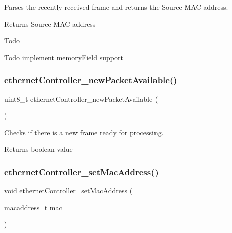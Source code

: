 Parses the recently received frame and returns the Source M\+AC address. 

\begin{DoxyReturn}{Returns}
Source M\+AC address 
\end{DoxyReturn}
\begin{DoxyRefDesc}{Todo}
\item[\mbox{\hyperlink{todo__todo000011}{Todo}}]implement \mbox{\hyperlink{structmemory_field}{memory\+Field}} support \end{DoxyRefDesc}
\mbox{\label{group__data__reception_gae030bd0d97a72b4c38d3ac55132dd7f3}} 
\subsubsection{\texorpdfstring{ethernetController\_newPacketAvailable()}{ethernetController\_newPacketAvailable()}}
{\footnotesize\ttfamily uint8\+\_\+t ethernet\+Controller\+\_\+new\+Packet\+Available (\begin{DoxyParamCaption}{ }\end{DoxyParamCaption})}



Checks if there is a new frame ready for processing. 

\begin{DoxyReturn}{Returns}
boolean value 
\end{DoxyReturn}
\mbox{\label{group__data__reception_ga4856965b47df99d3532a7d1cbb494e02}} 
\subsubsection{\texorpdfstring{ethernetController\_setMacAddress()}{ethernetController\_setMacAddress()}}
{\footnotesize\ttfamily void ethernet\+Controller\+\_\+set\+Mac\+Address (\begin{DoxyParamCaption}\item[{\mbox{\hyperlink{group__ethernet_gacb865bcbf50a6c8cef05581bfabff373}{macaddress\+\_\+t}}}]{mac }\end{DoxyParamCaption})}



